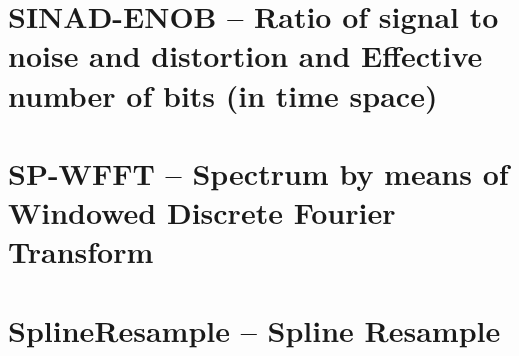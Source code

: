 \documentclass[12pt,a4paper,oneside]{report} %
\begin{document}
\section*{\examplesection} %

\resumecontents[maintoc]

\chapter{SINAD-ENOB -- Ratio of signal to noise and distortion and Effective number of bits (in time space)} %
\stopcontents[maintoc]
\section*{\infosection} %

\section*{\examplesection} %

\resumecontents[maintoc]

\chapter{SP-WFFT -- Spectrum by means of Windowed Discrete Fourier Transform} %
\stopcontents[maintoc]
\section*{\infosection} %

\section*{\examplesection} %

\resumecontents[maintoc]

\chapter{SplineResample -- Spline Resample} %
\stopcontents[maintoc]
\end{document}
